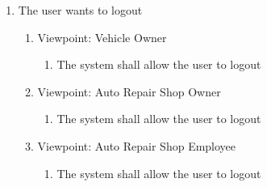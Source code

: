 \documentclass[12pt]{article}
\begin{document}
\begin{enumerate}[label=BE\arabic*., series=business_events]
	\item The user wants to logout
	      \begin{enumerate}[VP\arabic*.]
		      \item Viewpoint: Vehicle Owner
		            \begin{enumerate}
			            \item The system shall allow the user to logout
		            \end{enumerate}

		      \item Viewpoint: Auto Repair Shop Owner
		            \begin{enumerate}
			            \item The system shall allow the user to logout
		            \end{enumerate}

		      \item Viewpoint: Auto Repair Shop Employee
		            \begin{enumerate}
			            \item The system shall allow the user to logout
		            \end{enumerate}
	      \end{enumerate}
\end{enumerate}
\end{document}
